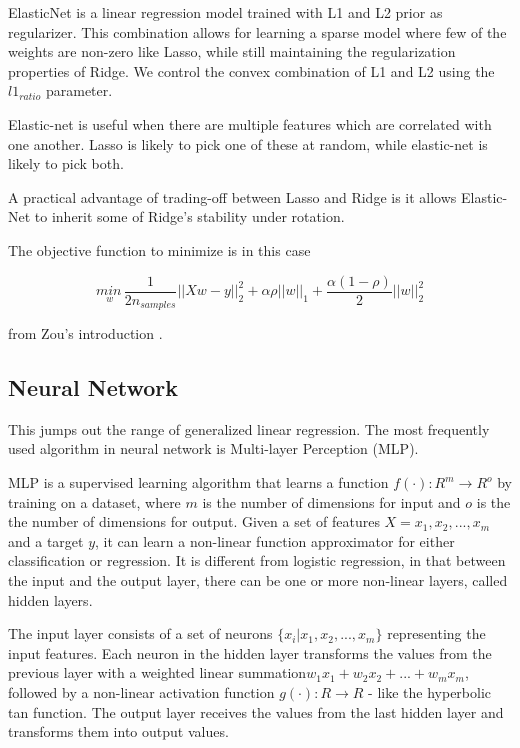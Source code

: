 ElasticNet is a linear regression model trained with L1 and L2 prior as regularizer. This combination allows for learning a sparse model where few of the weights are non-zero like Lasso, while still maintaining the regularization properties of Ridge. We control the convex combination of L1 and L2 using the $l1_{ratio}$ parameter.

Elastic-net is useful when there are multiple features which are correlated with one another. Lasso is likely to pick one of these at random, while elastic-net is likely to pick both.

A practical advantage of trading-off between Lasso and Ridge is it allows Elastic-Net to inherit some of Ridge’s stability under rotation.

The objective function to minimize is in this case

$$ \underset{w}{min\,} { \frac{1}{2n_{samples}} ||X w - y||_2 ^ 2 + \alpha \rho ||w||_1 +
\frac{\alpha(1-\rho)}{2} ||w||_2 ^ 2} $$

from Zou's introduction \cite{zou2005regularization}.

\subsection{Neural Network}

This jumps out the range of generalized linear regression. The most frequently used algorithm in neural network is Multi-layer Perception (MLP).

MLP is a supervised learning algorithm that learns a function $f(\cdot): R^m \rightarrow R^o$ by training on a dataset, where $m$ is the number of dimensions for input and $o$ is the the number of dimensions for output. Given a set of features $X = {x_1, x_2, ..., x_m}$ and a target $y$, it can learn a non-linear function approximator for either classification or regression. It is different from logistic regression, in that between the input and the output layer, there can be one or more non-linear layers, called hidden layers.

The input layer consists of a set of neurons $\{x_i | x_1, x_2, ..., x_m\}$ representing the input features. Each neuron in the hidden layer transforms the values from the previous layer with a weighted linear summation$ w_1x_1 + w_2x_2 + ... + w_mx_m$, followed by a non-linear activation function $g(\cdot):R \rightarrow R$ - like the hyperbolic tan function. The output layer receives the values from the last hidden layer and transforms them into output values. \cite{rumelhart1988learning}

